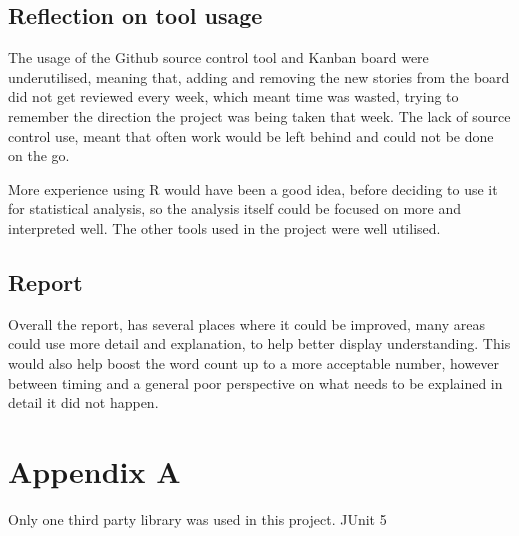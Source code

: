 \documentclass[a4paper,11pt]{article}
\begin{document}
\subsection{Reflection on tool usage}
The usage of the Github source control tool and Kanban board were underutilised, meaning that, adding and removing the new stories from the board did not get reviewed every week, which meant time was wasted, trying to remember the direction the project was being taken that week. The lack of source control use, meant that often work would be left behind and could not be done on the go.

More experience using R would have been a good idea, before deciding to use it for statistical analysis, so the analysis itself could be focused on more and interpreted well. The other tools used in the project were well utilised.
\subsection{Report}
Overall the report, has several places where it could be improved, many areas could use more detail and explanation, to help better display understanding. This would also help boost the word count up to a more acceptable number, however between timing and a general poor perspective on what needs to be explained in detail it did not happen.




\newpage
\section*{Appendix A}
Only one third party library was used in this project.
JUnit 5 
\end{document}
